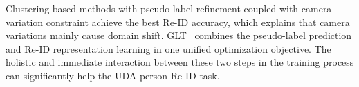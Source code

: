 \documentclass[a4paper,fleqn]{cas-dc}
\begin{document}
Clustering-based methods with pseudo-label refinement coupled with camera variation constraint achieve the best Re-ID accuracy, which explains that camera variations mainly cause domain shift. GLT~\cite{zheng_group-aware_2021} combines the pseudo-label prediction and Re-ID representation learning in one unified optimization objective. The holistic and immediate interaction between these two steps in the training process can significantly help the UDA person Re-ID task.
\begin{table} [t]
\caption{Image-based fully unsupervised person Re-ID evaluation results.}
\label{table:fully-unsupervised}
\end{table}
\end{document}
